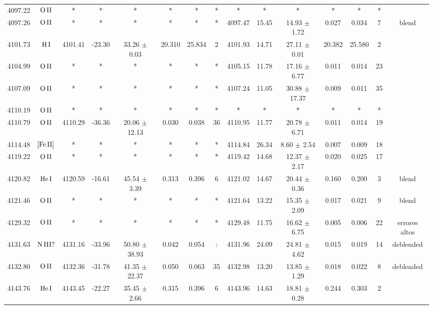 \documentclass{article}
\begin{document}
\begin{table*}
\begin{adjustbox}{width=\textwidth}
\begin{tabular}{ccccccccccccccc}
4097.22 & $\mbox{O}\thinspace \mbox{II}$ & * & * & * & * & * & * & * & * & * & * & * & * &  \\
4097.26 & $\mbox{O}\thinspace \mbox{II}$ & * & * & * & * & * & * & 4097.47 & 15.45 & 14.93 $\pm$ 1.72 & 0.027 & 0.034 & 7 &  blend \\
4101.73 & $\mbox{H}\thinspace \mbox{I}$ & 4101.41 & -23.30 & 33.26 $\pm$ 0.03 & 20.310 & 25.834 & 2 & 4101.93 & 14.71 & 27.11 $\pm$ 0.01 & 20.382 & 25.580 & 2 &  \\
4104.99 & $\mbox{O}\thinspace \mbox{II}$ & * & * & * & * & * & * & 4105.15 & 11.78 & 17.16 $\pm$ 6.77 & 0.011 & 0.014 & 23 &  \\
4107.09 & $\mbox{O}\thinspace \mbox{II}$ & * & * & * & * & * & * & 4107.24 & 11.05 & 30.88 $\pm$ 17.37 & 0.009 & 0.011 & 35 &  \\
4110.19 & $\mbox{O}\thinspace \mbox{II}$ & * & * & * & * & * & * & * & * & * & * & * & * &  \\
4110.79 & $\mbox{O}\thinspace \mbox{II}$ & 4110.29 & -36.36 & 20.06 $\pm$ 12.13 & 0.030 & 0.038 & 36 & 4110.95 & 11.77 & 20.78 $\pm$ 6.71 & 0.011 & 0.014 & 19 &  \\
4114.48 & $\mbox{[Fe}\thinspace \mbox{II]}$ & * & * & * & * & * & * & 4114.84 & 26.34 & 8.60 $\pm$ 2.54 & 0.007 & 0.009 & 18 &  \\
4119.22 & $\mbox{O}\thinspace \mbox{II}$ & * & * & * & * & * & * & 4119.42 & 14.68 & 12.37 $\pm$ 2.17 & 0.020 & 0.025 & 17 &  \\
4120.82 & $\mbox{He}\thinspace \mbox{I}$ & 4120.59 & -16.61 & 45.54 $\pm$ 3.39 & 0.313 & 0.396 & 6 & 4121.02 & 14.67 & 20.44 $\pm$ 0.36 & 0.160 & 0.200 & 3 &  blend \\
4121.46 & $\mbox{O}\thinspace \mbox{II}$ & * & * & * & * & * & * & 4121.64 & 13.22 & 15.35 $\pm$ 2.09 & 0.017 & 0.021 & 9 &  blend \\
4129.32 & $\mbox{O}\thinspace \mbox{II}$ & * & * & * & * & * & * & 4129.48 & 11.75 & 16.62 $\pm$ 6.75 & 0.005 & 0.006 & 22 &  errores altos \\
4131.63 & $\mbox{N}\thinspace \mbox{III?}$ & 4131.16 & -33.96 & 50.80 $\pm$ 38.93 & 0.042 & 0.054 & : & 4131.96 & 24.09 & 24.81 $\pm$ 4.62 & 0.015 & 0.019 & 14 &  deblended \\
4132.80 & $\mbox{O}\thinspace \mbox{II}$ & 4132.36 & -31.78 & 41.35 $\pm$ 22.37 & 0.050 & 0.063 & 35 & 4132.98 & 13.20 & 13.85 $\pm$ 1.29 & 0.018 & 0.022 & 8 &  deblended \\
4143.76 & $\mbox{He}\thinspace \mbox{I}$ & 4143.45 & -22.27 & 35.45 $\pm$ 2.66 & 0.315 & 0.396 & 6 & 4143.96 & 14.63 & 18.81 $\pm$ 0.28 & 0.244 & 0.303 & 2 &  \\

\end{tabular}
\end{adjustbox}
\end{table*}
\end{document}
